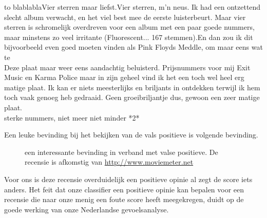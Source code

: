 \begin{table}[h]
\centering
\begin{tabu} to \textwidth {|X|}
\hline
blablablaVier sterren maar liefst.Vier sterren, m'n neus. Ik had een ontzettend slecht album verwacht, en het viel best mee de eerste luisterbeurt. Maar vier sterren is schromelijk overdreven voor een album met een paar goede nummers, maar minstens zo veel irritante (Fluorescent... 167 stemmen).En dan zou ik dit bijvoorbeeld even goed moeten vinden als Pink Floyds Meddle, om maar eens wat te \\ \hline
Deze plaat maar weer eens aandachtig beluisterd. Prijsnummers voor mij Exit Music en Karma Police maar in zijn geheel vind ik het een toch wel heel erg matige plaat. Ik kan er niets meesterlijks en briljants in ontdekken terwijl ik hem toch vaak genoeg heb gedraaid. Geen groeibriljantje dus, gewoon een zeer matige plaat.                                                                         \\  sterke nummers, niet meer niet minder *2*                                                                                                                                                                                                                                                                                                                                                                \\ \hline
\end{tabu}
\caption{Enkele vals positieve uit de muziekdataset}
\end{table}

Een leuke bevinding bij het bekijken van de vals positieve is volgende bevinding. 

\begin{figure}[h]%
    \centering
    \caption{een interessante bevinding in verband met valse positieve. De recensie is afkomstig van \url{http://www.moviemeter.net} }
\end{figure}

Voor ons is deze recensie overduidelijk een positieve opinie al zegt de score iets anders. Het feit dat onze classifier een positieve opinie kan bepalen voor een recensie die naar onze menig een foute score heeft meegekregen, duidt op de goede werking van onze Nederlandse gevoelsanalyse.


